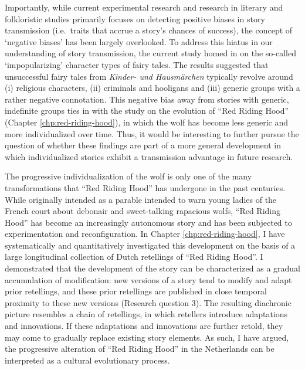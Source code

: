 Importantly, while current experimental research and research in literary and folkloristic studies primarily focuses on detecting positive biases in story transmission (i.e.\ traits that accrue a story's chances of success), the concept of `negative biases' has been largely overlooked. To address this hiatus in our understanding of story transmission, the current study homed in on the so-called `impopularizing' character types of fairy tales. The results suggested that unsuccessful fairy tales from \emph{Kinder- und Hausmärchen} typically revolve around (i) religious characters, (ii) criminals and hooligans and (iii) generic groups with a rather negative connotation. This negative bias away from stories with generic, indefinite groups ties in with the study on the evolution of ``Red Riding Hood'' (Chapter \ref{chp:red-riding-hood}), in which the wolf has become less generic and more individualized over time. Thus, it would be interesting to further pursue the question of whether these findings are part of a more general development in which individualized stories exhibit a transmission advantage in future research.

The progressive individualization of the wolf is only one of the many transformations that ``Red Riding Hood'' has undergone in the past centuries. While originally intended as a parable intended to warn young ladies of the French court about debonair and sweet-talking rapacious wolfs, ``Red Riding Hood'' has become an increasingly autonomous story and has been subjected to experimentation and reconfiguration. In Chapter \ref{chp:red-riding-hood}, I have systematically and quantitatively investigated this development on the basis of a large longitudinal collection of Dutch retellings of ``Red Riding Hood''. I demonstrated that the development of the story can be characterized as a gradual accumulation of modification: new versions of a story tend to modify and adapt prior retellings, and these prior retellings are published in close temporal proximity to these new versions (Research question 3). The resulting diachronic picture resembles a chain of retellings, in which retellers introduce adaptations and innovations. If these adaptations and innovations are further retold, they may come to gradually replace existing story elements. As such, I have argued, the progressive alteration of ``Red Riding Hood'' in the Netherlands can be interpreted as a cultural evolutionary process.

